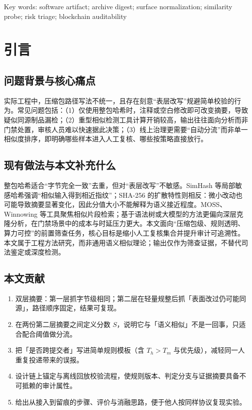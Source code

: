 \documentclass[UTF8,a4paper,zihao=5]{ctexart}
\begin{document}
\noindent Key words: software artifact; archive digest; surface normalization; similarity probe; risk triage; blockchain auditability

\section{引言}
\subsection{问题背景与核心痛点}
实际工程中，压缩包路径写法不统一，且存在刻意“表层改写”规避简单校验的行为。常见问题包括：（1）仅使用整包哈希时，注释或空白修改即可改变摘要，导致疑似同源制品漏检；（2）重型相似检测工具计算开销较高，输出往往面向分析而非门禁处置，审核人员难以快速据此决策；（3）线上治理更需要“自动分流”而非单一相似度排序，即明确哪些样本进入人工复核、哪些按策略直接放行。

\subsection{现有做法与本文补充什么}
整包哈希适合“字节完全一致”去重，但对“表层改写”不敏感。SimHash 等局部敏感哈希强调“相似输入得到相近指纹”；SHA-256 的扩散特性则相反：微小改动也可能导致摘要显著变化，因此分值大小不能解释为语义接近程度。MOSS、Winnowing 等工具聚焦相似片段检索\cite{moss,winnowing2003}；基于语法树或大模型的方法更偏向深层克隆分析\cite{mdpi2023review,llmCloneSurvey2023}，在门禁场景中的成本与时延压力更大\cite{fang2024llmcode}。本文面向“压缩包级、规则透明、算力可控”的前置筛查任务，核心目标是缩小人工复核集合并提升审计可追溯性。本文属于工程方法研究，而非通用语义相似理论；输出仅作为筛查证据，不替代司法鉴定或深度检测。

\subsection{本文贡献}
\begin{enumerate}[leftmargin=2em]
  \item 双层摘要：第一层抓字节级相同；第二层在轻量规整后抓「表面改过仍可能同源」，路径顺序固定，结果可复现。
  \item 在两份第二层摘要之间定义分数 $S$，说明它与「语义相似」不是一回事，只适合配合阈值做分流。
  \item 把「是否跨提交者」写进简单规则模板（含 $T_h>T_m$ 与优先级），减轻同一人重复投递带来的误报。
  \item 设计链上锚定与离线回放校验流程，使规则版本、判定分支与证据摘要具备不可抵赖的审计属性。
  \item 给出从接入到留痕的步骤、评价与消融思路，便于他人按同样协议复现实验。
\end{enumerate}
\end{document}
